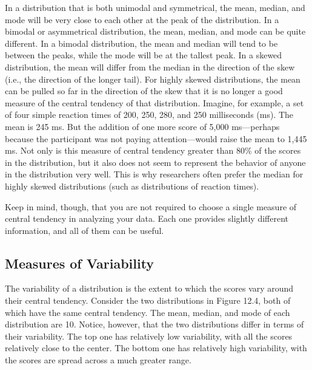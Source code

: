 In a distribution that is both unimodal and symmetrical, the mean, median, and mode will be very close to each other at the peak of the distribution. In a bimodal or asymmetrical distribution, the mean, median, and mode can be quite different. In a bimodal distribution, the mean and median will tend to be between the peaks, while the mode will be at the tallest peak. In a skewed distribution, the mean will differ from the median in the direction of the skew (i.e., the direction of the longer tail). For highly skewed distributions, the mean can be pulled so far in the direction of the skew that it is no longer a good measure of the central tendency of that distribution. Imagine, for example, a set of four simple reaction times of 200, 250, 280, and 250 milliseconds (ms). The mean is 245 ms. But the addition of one more score of 5,000 ms---perhaps because the participant was not paying attention---would raise the mean to 1,445 ms. Not only is this measure of central tendency greater than 80\% of the scores in the distribution, but it also does not seem to represent the behavior of anyone in the distribution very well. This is why researchers often prefer the median for highly skewed distributions (such as distributions of reaction times).


Keep in mind, though, that you are not required to choose a single measure of central tendency in analyzing your data. Each one provides slightly different information, and all of them can be useful.



\subsection{Measures of Variability}

The variability of a distribution is the extent to which the scores vary around their central tendency. Consider the two distributions in Figure 12.4, both of which have the same central tendency. The mean, median, and mode of each distribution are 10. Notice, however, that the two distributions differ in terms of their variability. The top one has relatively low variability, with all the scores relatively close to the center. The bottom one has relatively high variability, with the scores are spread across a much greater range.


